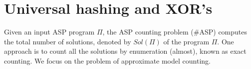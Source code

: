 \documentclass{svproc}
\def\asp{\textsf{\#ASP}\xspace}
\newcommand{\XOR}{\textsc{xor}} %
\newcommand{\fff}{\ensuremath{\Pi}\xspace}
\newcommand{\sol}{$Sol(\Pi)$\xspace}
\newcommand{\sysfont}{\textit}
\newcommand{\xorro}{\sysfont{xorro}}
\begin{document}




%

\section{Universal hashing and XOR's} \label{sec:hashing}
Given an input ASP program \fff, the ASP counting problem (\asp) computes the total number of solutions, denoted by \sol of the program \fff.
%
One approach is to count all the solutions by enumeration (almost), known as exact counting.
%
We focus on the problem of approximate model counting. 
%
%
\end{document}
